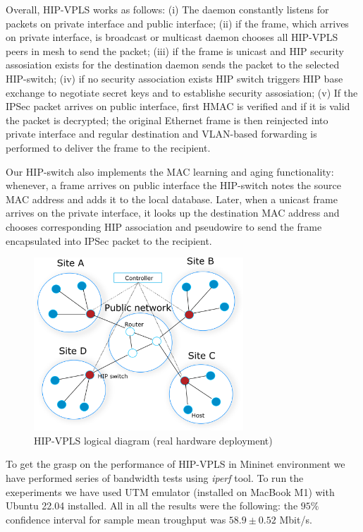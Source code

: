 Overall, HIP-VPLS works as follows: (i) The daemon constantly listens for packets on private interface 
and public interface; (ii) if the frame, which arrives on private interface, is broadcast or multicast 
daemon chooses all HIP-VPLS peers in mesh to send the packet; 
(iii) if the frame is unicast and HIP security assosiation exists for the destination daemon 
sends the packet to the selected HIP-switch; (iv) if no security association exists HIP switch triggers 
HIP base exchange to negotiate secret keys and to establishe security assosiation; (v) If the 
IPSec packet arrives on public interface, first HMAC is verified and if it is valid the packet 
is decrypted; the original Ethernet frame is then reinjected into private interface and 
regular destination and VLAN-based forwarding is performed to deliver the frame to the recipient. 

Our HIP-switch also implements the MAC learning and aging functionality: whenever, a frame arrives 
on public interface the HIP-switch notes the source MAC address 
and adds it to the local database. Later, when a unicast frame arrives on the private interface, 
it looks up the destination MAC address and chooses corresponding HIP association and pseudowire to send
the frame encapsulated into IPSec packet to the recipient. 


\begin{figure}[h!]
    \centering
    \includegraphics[width=0.7\textwidth]{graphics/hw-hipls.png}
    \caption{HIP-VPLS logical diagram (real hardware deployment)}
    \label{fig:mininet}
\end{figure}

To get the grasp on the performance of HIP-VPLS in Mininet environment we 
have performed series of bandwidth tests using {\it iperf} tool. To run
the exeperiments we have used UTM emulator (installed on MacBook M1) 
with Ubuntu 22.04 installed. All in all the results were the following: 
the $95\%$ confidence interval for sample mean troughput was 
$58.9 \pm 0.52$ Mbit/s.

